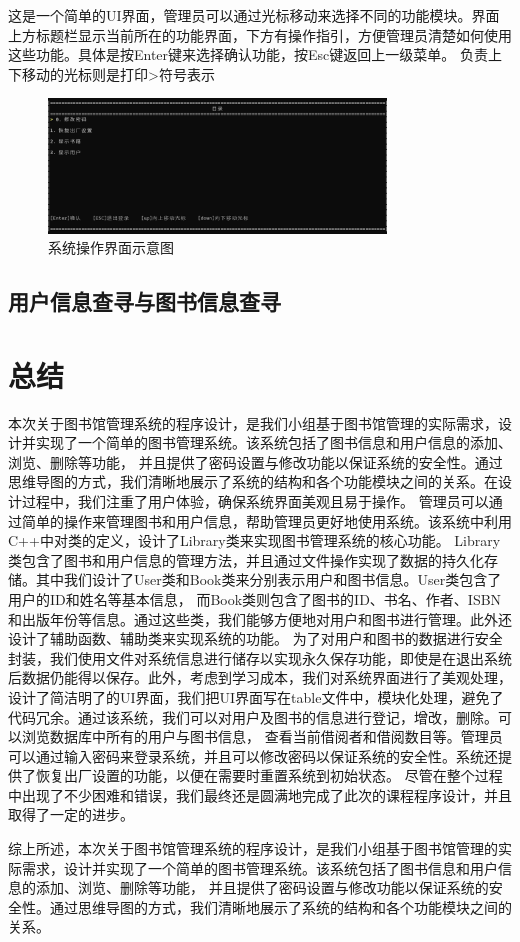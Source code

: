 \documentclass{article}
\begin{document}
这是一个简单的UI界面，管理员可以通过光标移动来选择不同的功能模块。界面上方标题栏显示当前所在的功能界面，下方有操作指引，方便管理员清楚如何使用这些功能。具体是按Enter键来选择确认功能，按Esc键返回上一级菜单。
负责上下移动的光标则是打印>符号表示

\begin{figure}[H]
    \centering
    \includegraphics[width=0.8\textwidth]{system.png}
    \caption{系统操作界面示意图}
\end{figure}

\subsection{用户信息查寻与图书信息查寻}


\section{总结}

本次关于图书馆管理系统的程序设计，是我们小组基于图书馆管理的实际需求，设计并实现了一个简单的图书管理系统。该系统包括了图书信息和用户信息的添加、浏览、删除等功能，
并且提供了密码设置与修改功能以保证系统的安全性。通过思维导图的方式，我们清晰地展示了系统的结构和各个功能模块之间的关系。在设计过程中，我们注重了用户体验，确保系统界面美观且易于操作。
管理员可以通过简单的操作来管理图书和用户信息，帮助管理员更好地使用系统。该系统中利用C++中对类的定义，设计了Library类来实现图书管理系统的核心功能。
Library类包含了图书和用户信息的管理方法，并且通过文件操作实现了数据的持久化存储。其中我们设计了User类和Book类来分别表示用户和图书信息。User类包含了用户的ID和姓名等基本信息，
而Book类则包含了图书的ID、书名、作者、ISBN和出版年份等信息。通过这些类，我们能够方便地对用户和图书进行管理。此外还设计了辅助函数、辅助类来实现系统的功能。
为了对用户和图书的数据进行安全封装，我们使用文件对系统信息进行储存以实现永久保存功能，即使是在退出系统后数据仍能得以保存。此外，考虑到学习成本，我们对系统界面进行了美观处理，
设计了简洁明了的UI界面，我们把UI界面写在table文件中，模块化处理，避免了代码冗余。通过该系统，我们可以对用户及图书的信息进行登记，增改，删除。可以浏览数据库中所有的用户与图书信息，
查看当前借阅者和借阅数目等。管理员可以通过输入密码来登录系统，并且可以修改密码以保证系统的安全性。系统还提供了恢复出厂设置的功能，以便在需要时重置系统到初始状态。
尽管在整个过程中出现了不少困难和错误，我们最终还是圆满地完成了此次的课程程序设计，并且取得了一定的进步。

综上所述，本次关于图书馆管理系统的程序设计，是我们小组基于图书馆管理的实际需求，设计并实现了一个简单的图书管理系统。该系统包括了图书信息和用户信息的添加、浏览、删除等功能，
并且提供了密码设置与修改功能以保证系统的安全性。通过思维导图的方式，我们清晰地展示了系统的结构和各个功能模块之间的关系。 
\end{document}
